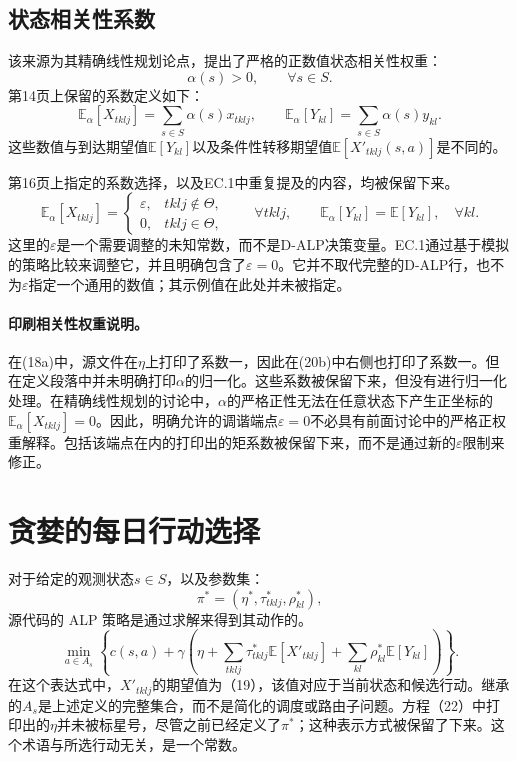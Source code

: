 \documentclass{article}
\begin{document}
\subsection*{状态相关性系数}
该来源为其精确线性规划论点，提出了严格的正数值状态相关性权重：
\[
\alpha(s)>0,\qquad\forall s\in S.
\]
第14页上保留的系数定义如下：
\[
\mathbb E_\alpha[X_{tklj}]=\sum_{s\in S}\alpha(s)x_{tklj},\qquad
\mathbb E_\alpha[Y_{kl}]=\sum_{s\in S}\alpha(s)y_{kl}.
\]
这些数值与到达期望值$\mathbb E[Y_{kl}]$以及条件性转移期望值$\mathbb E[X'_{tklj}(s,a)]$是不同的。

第16页上指定的系数选择，以及EC.1中重复提及的内容，均被保留下来。
\[
\mathbb E_\alpha[X_{tklj}]=
\begin{cases}
\varepsilon,&tklj\notin\Theta,\\
0,&tklj\in\Theta,
\end{cases}
\qquad\forall tklj,
\qquad
\mathbb E_\alpha[Y_{kl}]=\mathbb E[Y_{kl}],\quad\forall kl.
\]
这里的$\varepsilon$是一个需要调整的未知常数，而不是D-ALP决策变量。EC.1通过基于模拟的策略比较来调整它，并且明确包含了$\varepsilon=0$。它并不取代完整的D-ALP行，也不为$\varepsilon$指定一个通用的数值；其示例值在此处并未被指定。

\paragraph{印刷相关性权重说明。}
在(18a)中，源文件在$\eta$上打印了系数一，因此在(20b)中右侧也打印了系数一。但在定义段落中并未明确打印$\alpha$的归一化。这些系数被保留下来，但没有进行归一化处理。在精确线性规划的讨论中，$\alpha$的严格正性无法在任意状态下产生正坐标的$\mathbb E_\alpha[X_{tklj}]=0$。因此，明确允许的调谐端点$\varepsilon=0$不必具有前面讨论中的严格正权重解释。包括该端点在内的打印出的矩系数被保留下来，而不是通过新的$\varepsilon$限制来修正。

\section*{贪婪的每日行动选择}
对于给定的观测状态$s\in S$，以及参数集：
\[
\pi^*=(\eta^*,\tau^*_{tklj},\rho^*_{kl}),
\]
源代码的 ALP 策略是通过求解来得到其动作的。
\begin{equation}
\min_{a\in A_s}
\left\{c(s,a)+\gamma\left(
\eta+\sum_{tklj}\tau^*_{tklj}\mathbb E[X'_{tklj}]
+\sum_{kl}\rho^*_{kl}\mathbb E[Y_{kl}]
\right)\right\}.
\tag{22}
\end{equation}
在这个表达式中，$X'_{tklj}$的期望值为（19），该值对应于当前状态和候选行动。继承的$A_s$是上述定义的完整集合，而不是简化的调度或路由子问题。方程（22）中打印出的$\eta$并未被标星号，尽管之前已经定义了$\pi^*$；这种表示方式被保留了下来。这个术语与所选行动无关，是一个常数。
\end{document}
